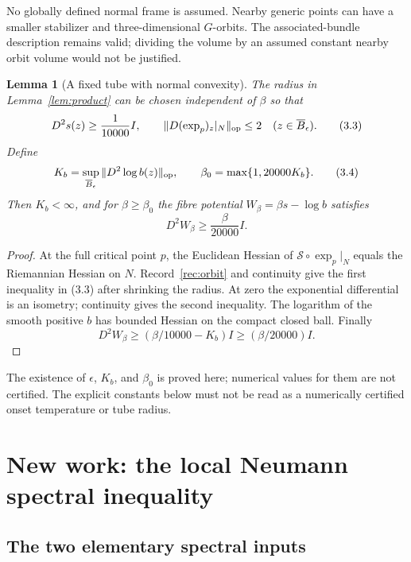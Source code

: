 \documentclass[11pt,oneside]{article}
\newtheorem{lemma}[theorem]{Lemma}
\newcommand{\cS}{\mathcal S}
\begin{document}
No globally defined normal frame is assumed.
Nearby generic points can have a smaller
stabilizer and three-dimensional \(G\)-orbits.
The associated-bundle description remains
valid; dividing the volume by an assumed
constant nearby orbit volume would not be
justified.

\begin{lemma}[A fixed tube with normal convexity]
\label{lem:convexity}
The radius in Lemma~\ref{lem:product} can be
chosen independent of \(\beta\) so that
\[
 D^2s(z)\ge\frac1{10000}I,\qquad
 \|D(\exp_p)_z|_N\|_{\rm op}\le2
                         \quad(z\in\overline B_\epsilon).
 \tag{3.3}
\]
Define
\[
 K_b=\sup_{\overline B_\epsilon}
                         \|D^2\log b(z)\|_{\rm op},\qquad
 \beta_0=\max\{1,20000K_b\}.
 \tag{3.4}
\]
Then \(K_b<\infty\), and for \(\beta\ge\beta_0\)
the fibre potential \(W_\beta=\beta s-\log b\)
satisfies
\[
                         D^2W_\beta\ge\frac{\beta}{20000}I.
 \tag{3.5}
\]
\end{lemma}
\begin{proof}
At the full critical point \(p\), the Euclidean
Hessian of \(\cS\circ\exp_p|_N\) equals the
Riemannian Hessian on \(N\). Record~\ref{rec:orbit}
and continuity give the first inequality in
(3.3) after shrinking the radius. At zero
the exponential differential is an isometry;
continuity gives the second inequality.
The logarithm of the smooth positive \(b\)
has bounded Hessian on the compact closed
ball. Finally
\[
 D^2W_\beta\ge(\beta/10000-K_b)I
                                  \ge(\beta/20000)I.
\]
\end{proof}

The existence of \(\epsilon\), \(K_b\), and
\(\beta_0\) is proved here; numerical values
for them are not certified. The explicit
constants below must not be read as a
numerically certified onset temperature or
tube radius.

\section{New work: the local Neumann spectral inequality}

\subsection{The two elementary spectral inputs}
\end{document}
